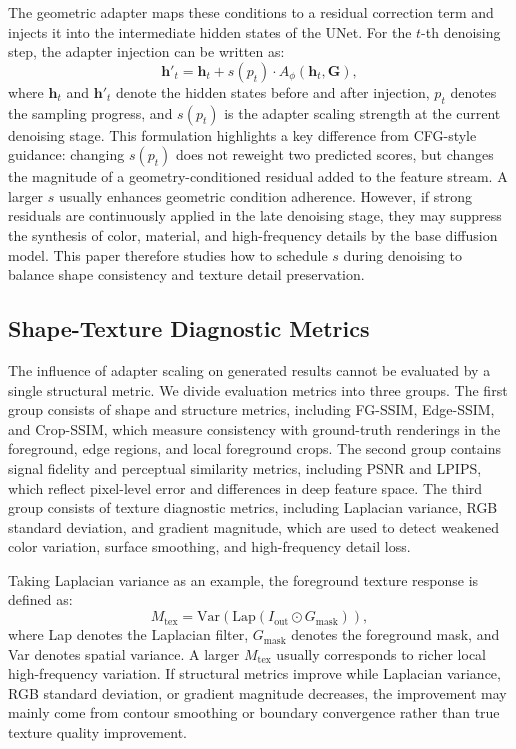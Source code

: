 \documentclass[times,twocolumn,final]{elsarticle}
\begin{document}
The geometric adapter maps these conditions to a residual correction term and injects it into the intermediate hidden states of the UNet. For the $t$-th denoising step, the adapter injection can be written as:
\begin{equation}
\mathbf{h}'_t = \mathbf{h}_t + s(p_t) \cdot A_\phi(\mathbf{h}_t, \mathbf{G}),
\label{eq:injection}
\end{equation}
where $\mathbf{h}_t$ and $\mathbf{h}'_t$ denote the hidden states before and after injection, $p_t$ denotes the sampling progress, and $s(p_t)$ is the adapter scaling strength at the current denoising stage. This formulation highlights a key difference from CFG-style guidance: changing $s(p_t)$ does not reweight two predicted scores, but changes the magnitude of a geometry-conditioned residual added to the feature stream. A larger $s$ usually enhances geometric condition adherence. However, if strong residuals are continuously applied in the late denoising stage, they may suppress the synthesis of color, material, and high-frequency details by the base diffusion model. This paper therefore studies how to schedule $s$ during denoising to balance shape consistency and texture detail preservation.

\subsection{Shape-Texture Diagnostic Metrics}
\label{subsec:metrics}

The influence of adapter scaling on generated results cannot be evaluated by a single structural metric. We divide evaluation metrics into three groups. The first group consists of shape and structure metrics, including FG-SSIM, Edge-SSIM, and Crop-SSIM, which measure consistency with ground-truth renderings in the foreground, edge regions, and local foreground crops. The second group contains signal fidelity and perceptual similarity metrics, including PSNR and LPIPS, which reflect pixel-level error and differences in deep feature space. The third group consists of texture diagnostic metrics, including Laplacian variance, RGB standard deviation, and gradient magnitude, which are used to detect weakened color variation, surface smoothing, and high-frequency detail loss.

Taking Laplacian variance as an example, the foreground texture response is defined as:
\begin{equation}
M_\text{tex} = \text{Var}(\text{Lap}(I_\text{out} \odot G_\text{mask})),
\end{equation}
where Lap denotes the Laplacian filter, $G_\text{mask}$ denotes the foreground mask, and Var denotes spatial variance. A larger $M_\text{tex}$ usually corresponds to richer local high-frequency variation. If structural metrics improve while Laplacian variance, RGB standard deviation, or gradient magnitude decreases, the improvement may mainly come from contour smoothing or boundary convergence rather than true texture quality improvement.
\end{document}
